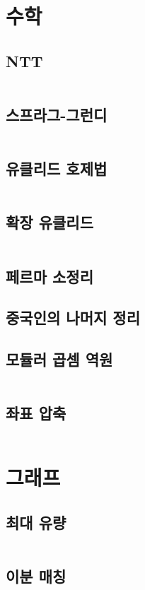 \documentclass{article}
\begin{document}
\section{수학}
\subsection{NTT}
\inputminted{python}{codes/ntt.py}
\subsection{스프라그-그런디}
\inputminted{python}{codes/nim.py}
\subsection{유클리드 호제법}
\inputminted{cpp}{codes/euclid.cpp}
\subsection{확장 유클리드}
\inputminted{python}{codes/eea.py}
\subsection{페르마 소정리}

\subsection{중국인의 나머지 정리}
\subsection{모듈러 곱셈 역원}
\inputminted{python}{codes/modular.py}
\subsection{좌표 압축}
\inputminted{python}{codes/comp.py}

\section{그래프}
\subsection{최대 유량}
\inputminted{python}{codes/mf.py}
\subsection{이분 매칭}
\inputminted{python}{codes/bimatch.py}
\end{document}
